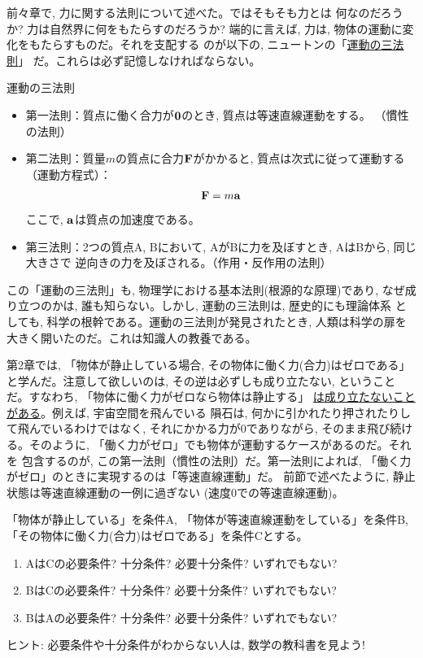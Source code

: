 前々章で, 力に関する法則について述べた。ではそもそも力とは
何なのだろうか? 力は自然界に何をもたらすのだろうか? 
端的に言えば, 力は, 物体の運動に変化をもたらすものだ。それを支配する
のが以下の, ニュートンの「\underline{運動の三法則}」
だ。これらは必ず記憶しなければならない。
\begin{itembox}{運動の三法則}
\begin{itemize}
\item 第一法則：質点に働く合力が${\bf 0}$のとき, 質点は等速直線運動をする。
（慣性の法則）
\item 第二法則：質量$m$の質点に合力${\bf F}$がかかると, 質点は次式に従って運動する
（運動方程式）：
\begin{eqnarray}
{\bf F}=m{\bf a}\label{eq:motion}
\end{eqnarray}
ここで, ${\bf a}$は質点の加速度である。
\item 第三法則：2つの質点A, Bにおいて, AがBに力を及ぼすとき, AはBから, 同じ大きさで
逆向きの力を及ぼされる。（作用・反作用の法則）
\end{itemize}
\end{itembox}

この「運動の三法則」も, 物理学における基本法則(根源的な原理)であり, 
なぜ成り立つのかは, 誰も知らない。しかし, 運動の三法則は, 歴史的にも理論体系
としても, 科学の根幹である。運動の三法則が発見されたとき, 人類は科学の扉を
大きく開いたのだ。これは知識人の教養である。\mv

第2章では, 「物体が静止している場合, その物体に働く力(合力)はゼロである」
と学んだ。注意して欲しいのは, その逆は必ずしも成り立たない, 
ということだ。すなわち, 「物体に働く力がゼロなら物体は静止する」
\underline{は成り立たないことがある}。例えば, 宇宙空間を飛んでいる
隕石は, 何かに引かれたり押されたりして飛んでいるわけではなく, 
それにかかる力が0でありながら, そのまま飛び続ける。そのように, 
「働く力がゼロ」でも物体が運動するケースがあるのだ。それを
包含するのが, この第一法則（慣性の法則）だ。第一法則によれば, 
「働く力がゼロ」のときに実現するのは「等速直線運動」だ。
前節で述べたように, 静止状態は等速直線運動の一例に過ぎない
(速度0での等速直線運動)。\mv

\begin{q}\label{q:motion1condition}「物体が静止している」を条件A, 
「物体が等速直線運動をしている」を条件B, 「その物体に働く力(合力)はゼロである」を条件Cとする。
\begin{enumerate}
\item AはCの必要条件? 十分条件? 必要十分条件? いずれでもない?
\item BはCの必要条件? 十分条件? 必要十分条件? いずれでもない?
\item BはAの必要条件? 十分条件? 必要十分条件? いずれでもない?
\end{enumerate}
{\small ヒント: 必要条件や十分条件がわからない人は, 数学の教科書を見よう!}
\end{q}
\mv

